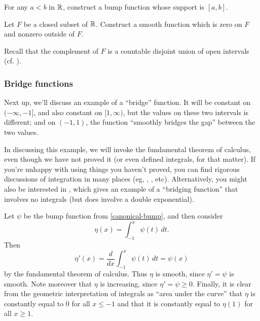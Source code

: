 \begin{exercise}
	For any $a < b$ in $\mathbb{R}$, construct a bump function whose support is $[a,b]$. 
\end{exercise}

\begin{exercise}
	Let $F$ be a closed subset of $\mathbb{R}$. Construct a smooth function which is zero on $F$ and nonzero outside of $F$. \begin{hint} Recall that the complement of $F$ is a countable disjoint union of open intervals (cf. \cite[theorem 6.17]{protter-morrey}). \end{hint}
\end{exercise}

\subsubsection*{Bridge functions}

Next up, we'll discuss an example of a ``bridge'' function. It will be constant on $(-\infty, -1]$, and also constant on $[1, \infty)$, but the values on these two intervals is different; and on $(-1,1)$, the function ``smoothly bridges the gap'' between the two values. 

In discussing this example, we will invoke the fundamental theorem of calculus, even though we have not proved it (or even defined integrals, for that matter). If you're unhappy with using things you haven't proved, you can find rigorous discussions of integration in many places (eg, \cite[chapter 5]{protter-morrey}, \cite[chapter 6]{rudin}, etc). Alternatively, you might also be interested in \cite[chapter 3, example 12]{counterexamples}, which gives an example of a ``bridging function'' that involves no integrals (but does involve a double exponential). 

\begin{example} \label{bridge-function}
	Let $\psi$ be the bump function from \cref{canonical-bump}, and then consider 
	\[ \eta(x) = \int_{-1}^x \psi(t)\, dt. \]
	Then 
	\[ \eta'(x) = \frac{d}{dx} \int_{-1}^x \psi(t)\, dt = \psi(x) \]
	by the fundamental theorem of calculus. Thus $\eta$ is smooth, since $\eta' = \psi$ is smooth. Note moreover that $\eta$ is increasing, since $\eta' = \psi \geq 0$. Finally, it is clear from the geometric interpretation of integrals as ``area under the curve'' that $\eta$ is constantly equal to 0 for all $x \leq -1$ and that it is constantly equal to $\eta(1)$ for all $x \geq 1$. 
\end{example}


